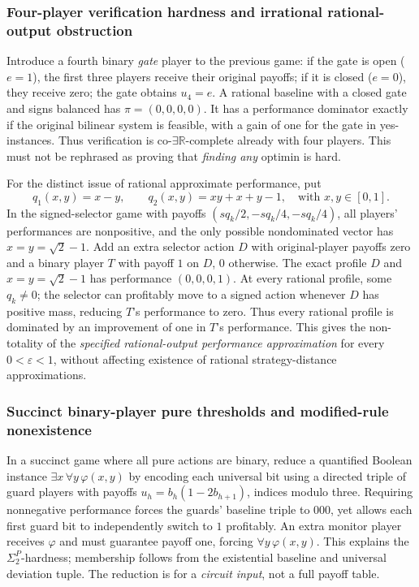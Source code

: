 \documentclass[11pt,a4paper]{article}
\providecommand{\coER}{\mathrm{co}\text{-}\exists\mathbb R}
\begin{document}
\subsubsection*{Four-player verification hardness and irrational rational-output obstruction}
Introduce a fourth binary \emph{gate} player to the previous game: if the gate is open ($e=1$), the first three players receive their original payoffs; if it is closed ($e=0$), they receive zero; the gate obtains $u_4=e$. A rational baseline with a closed gate and signs balanced has $\pi=(0,0,0,0)$. It has a performance dominator exactly if the original bilinear system is feasible, with a gain of one for the gate in yes-instances. Thus verification is $\coER$-complete already with four players. This must not be rephrased as proving that \emph{finding any} optimin is hard.

For the distinct issue of rational approximate performance, put
\[
 q_1(x,y)=x-y,\qquad q_2(x,y)=xy+x+y-1,
\quad\text{with }x,y\in[0,1].
\tag{OPT.14}
\]
In the signed-selector game with payoffs $(s q_k/2,-s q_k/4,-s q_k/4)$, all players' performances are nonpositive, and the only possible nondominated vector has $x=y=\sqrt2-1$. Add an extra selector action $D$ with original-player payoffs zero and a binary player $T$ with payoff $1$ on $D$, $0$ otherwise. The exact profile $D$ and $x=y=\sqrt2-1$ has performance $(0,0,0,1)$. At every rational profile, some $q_k\ne0$; the selector can profitably move to a signed action whenever $D$ has positive mass, reducing $T$'s performance to zero. Thus every rational profile is dominated by an improvement of one in $T$'s performance. This gives the non-totality of the \emph{specified rational-output performance approximation} for every $0<\varepsilon<1$, without affecting existence of rational strategy-distance approximations.

\subsubsection*{Succinct binary-player pure thresholds and modified-rule nonexistence}
In a succinct game where all pure actions are binary, reduce a quantified Boolean instance $\exists x\,\forall y\,\varphi(x,y)$ by encoding each universal bit using a directed triple of guard players with payoffs $u_h=b_h(1-2b_{h+1})$, indices modulo three. Requiring nonnegative performance forces the guards' baseline triple to $000$, yet allows each first guard bit to independently switch to $1$ profitably. An extra monitor player receives $\varphi$ and must guarantee payoff one, forcing $\forall y\,\varphi(x,y)$. This explains the $\Sigma_2^P$-hardness; membership follows from the existential baseline and universal deviation tuple. The reduction is for a \emph{circuit input}, not a full payoff table.
\end{document}
